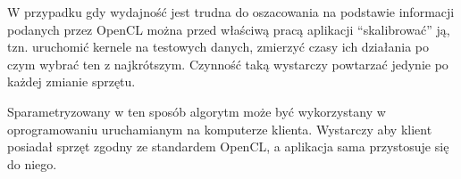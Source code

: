 W przypadku gdy wydajność jest trudna do oszacowania na podstawie informacji podanych przez OpenCL można przed właściwą pracą aplikacji ``skalibrować'' ją, tzn. uruchomić kernele na testowych danych, zmierzyć czasy ich działania po czym wybrać ten z najkrótszym. Czynność taką wystarczy powtarzać jedynie po każdej zmianie sprzętu. \linebreak

Sparametryzowany w ten sposób algorytm może być wykorzystany w oprogramowaniu uruchamianym na komputerze klienta. Wystarczy aby klient posiadał sprzęt zgodny ze standardem OpenCL, a aplikacja sama przystosuje się do niego.
\linebreak
